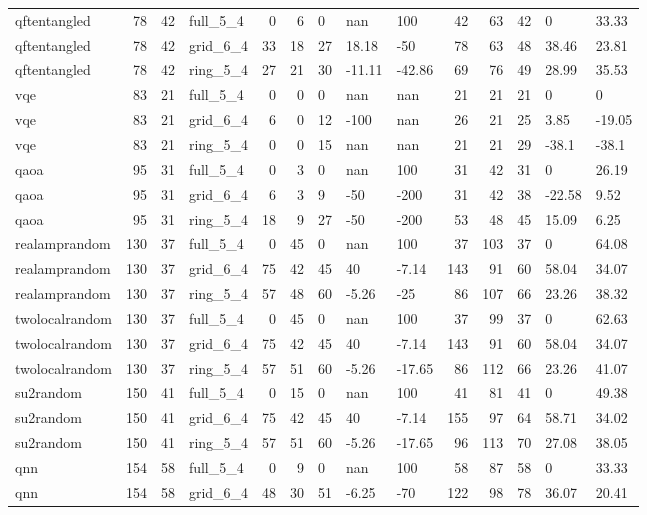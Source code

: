 \begin{longtable}{lrrlrrlllrrlll}
qftentangled & 78 & 42 & full\_5\_4 & 0 & 6 & 0 & nan & 100 & 42 & 63 & 42 & 0 & 33.33 \\
qftentangled & 78 & 42 & grid\_6\_4 & 33 & 18 & 27 & 18.18 & -50 & 78 & 63 & 48 & 38.46 & 23.81 \\
qftentangled & 78 & 42 & ring\_5\_4 & 27 & 21 & 30 & -11.11 & -42.86 & 69 & 76 & 49 & 28.99 & 35.53 \\
vqe & 83 & 21 & full\_5\_4 & 0 & 0 & 0 & nan & nan & 21 & 21 & 21 & 0 & 0 \\
vqe & 83 & 21 & grid\_6\_4 & 6 & 0 & 12 & -100 & nan & 26 & 21 & 25 & 3.85 & -19.05 \\
vqe & 83 & 21 & ring\_5\_4 & 0 & 0 & 15 & nan & nan & 21 & 21 & 29 & -38.1 & -38.1 \\
qaoa & 95 & 31 & full\_5\_4 & 0 & 3 & 0 & nan & 100 & 31 & 42 & 31 & 0 & 26.19 \\
qaoa & 95 & 31 & grid\_6\_4 & 6 & 3 & 9 & -50 & -200 & 31 & 42 & 38 & -22.58 & 9.52 \\
qaoa & 95 & 31 & ring\_5\_4 & 18 & 9 & 27 & -50 & -200 & 53 & 48 & 45 & 15.09 & 6.25 \\
realamprandom & 130 & 37 & full\_5\_4 & 0 & 45 & 0 & nan & 100 & 37 & 103 & 37 & 0 & 64.08 \\
realamprandom & 130 & 37 & grid\_6\_4 & 75 & 42 & 45 & 40 & -7.14 & 143 & 91 & 60 & 58.04 & 34.07 \\
realamprandom & 130 & 37 & ring\_5\_4 & 57 & 48 & 60 & -5.26 & -25 & 86 & 107 & 66 & 23.26 & 38.32 \\
twolocalrandom & 130 & 37 & full\_5\_4 & 0 & 45 & 0 & nan & 100 & 37 & 99 & 37 & 0 & 62.63 \\
twolocalrandom & 130 & 37 & grid\_6\_4 & 75 & 42 & 45 & 40 & -7.14 & 143 & 91 & 60 & 58.04 & 34.07 \\
twolocalrandom & 130 & 37 & ring\_5\_4 & 57 & 51 & 60 & -5.26 & -17.65 & 86 & 112 & 66 & 23.26 & 41.07 \\
su2random & 150 & 41 & full\_5\_4 & 0 & 15 & 0 & nan & 100 & 41 & 81 & 41 & 0 & 49.38 \\
su2random & 150 & 41 & grid\_6\_4 & 75 & 42 & 45 & 40 & -7.14 & 155 & 97 & 64 & 58.71 & 34.02 \\
su2random & 150 & 41 & ring\_5\_4 & 57 & 51 & 60 & -5.26 & -17.65 & 96 & 113 & 70 & 27.08 & 38.05 \\
qnn & 154 & 58 & full\_5\_4 & 0 & 9 & 0 & nan & 100 & 58 & 87 & 58 & 0 & 33.33 \\
qnn & 154 & 58 & grid\_6\_4 & 48 & 30 & 51 & -6.25 & -70 & 122 & 98 & 78 & 36.07 & 20.41 \\

\end{longtable}
